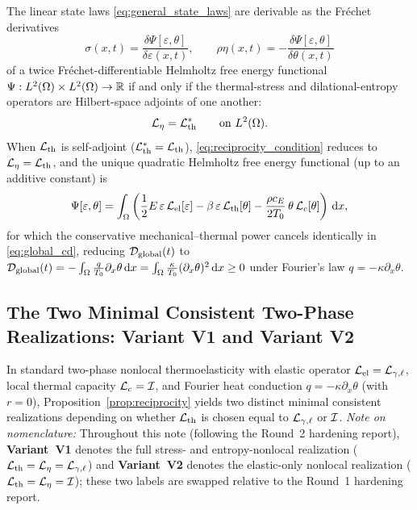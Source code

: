 \begin{proposition}\label{prop:reciprocity}
The linear state laws \eqref{eq:general_state_laws} are derivable as the Fr{\'e}chet derivatives
\begin{equation}\label{eq:frechet_state_laws}
  \sigma(x,t) = \frac{\delta\Psi[\varepsilon,\theta]}{\delta\varepsilon(x,t)}, \qquad
  \rho\eta(x,t) = -\frac{\delta\Psi[\varepsilon,\theta]}{\delta\theta(x,t)}
\end{equation}
of a twice Fr{\'e}chet-differentiable Helmholtz free energy functional $\Psi : L^2(\Omega)\times L^2(\Omega) \to \mathbb{R}$ if and only if the thermal-stress and dilational-entropy operators are Hilbert-space adjoints of one another:
\begin{equation}\label{eq:reciprocity_condition}
  \mathcal{L}_\eta = \mathcal{L}_{\mathrm{th}}^* \qquad \text{on } L^2(\Omega).
\end{equation}
When $\mathcal{L}_{\mathrm{th}}$ is self-adjoint ($\mathcal{L}_{\mathrm{th}}^* = \mathcal{L}_{\mathrm{th}}$), \eqref{eq:reciprocity_condition} reduces to $\mathcal{L}_\eta = \mathcal{L}_{\mathrm{th}}$, and the unique quadratic Helmholtz free energy functional (up to an additive constant) is
\begin{equation}\label{eq:master_psi}
  \Psi[\varepsilon,\theta] = \int_\Omega \left(\frac{1}{2}E\,\varepsilon\,\mathcal{L}_{\mathrm{el}}[\varepsilon] - \beta\,\varepsilon\,\mathcal{L}_{\mathrm{th}}[\theta] - \frac{\rho c_E}{2T_0}\,\theta\,\mathcal{L}_c[\theta]\right)\,\mathrm{d} x,
\end{equation}
for which the conservative mechanical--thermal power cancels identically in \eqref{eq:global_cd}, reducing $\mathcal{D}_{\mathrm{global}}(t)$ to $\mathcal{D}_{\mathrm{global}}(t) = -\int_\Omega \frac{q}{T_0}\partial_x\theta\,\mathrm{d} x = \int_\Omega \frac{\kappa}{T_0}(\partial_x\theta)^2\,\mathrm{d} x \ge 0$ under Fourier's law $q = -\kappa\partial_x\theta$.
\end{proposition}

\subsection{The Two Minimal Consistent Two-Phase Realizations: Variant V1 and Variant V2}\label{subsec:V1_V2}

In standard two-phase nonlocal thermoelasticity with elastic operator $\mathcal{L}_{\mathrm{el}} = \mathcal{L}_{\gamma,\ell}$, local thermal capacity $\mathcal{L}_c = \mathcal{I}$, and Fourier heat conduction $q = -\kappa\partial_x\theta$ (with $r=0$), Proposition~\ref{prop:reciprocity} yields two distinct minimal consistent realizations depending on whether $\mathcal{L}_{\mathrm{th}}$ is chosen equal to $\mathcal{L}_{\gamma,\ell}$ or $\mathcal{I}$. \emph{Note on nomenclature:} Throughout this note (following the Round~2 hardening report), \textbf{Variant~V1} denotes the full stress- and entropy-nonlocal realization ($\mathcal{L}_{\mathrm{th}} = \mathcal{L}_\eta = \mathcal{L}_{\gamma,\ell}$) and \textbf{Variant~V2} denotes the elastic-only nonlocal realization ($\mathcal{L}_{\mathrm{th}} = \mathcal{L}_\eta = \mathcal{I}$); these two labels are swapped relative to the Round~1 hardening report.

